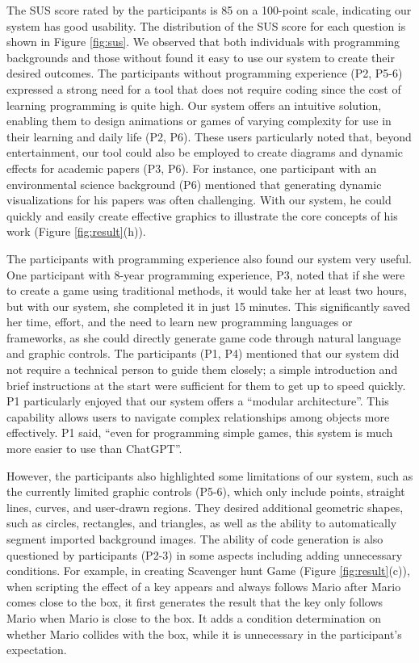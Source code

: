 The SUS score rated by the participants %
is 85 on a 100-point scale, indicating our system has good usability. The distribution of the SUS score for each question is shown in Figure \ref{fig:sus}. We observed that both individuals with programming backgrounds and those without found it easy to use our system to create their desired outcomes. The participants without programming experience (P2, P5-6) expressed a strong need for a tool that does not require coding since the cost of learning programming is quite high. Our system offers an intuitive solution, enabling them to design animations or games of varying complexity for use in their learning and daily life (P2, P6).
These users particularly noted that, beyond entertainment, our tool could also be employed to create diagrams and dynamic effects for academic papers (P3, P6). For instance, one participant with an environmental science background (P6) mentioned that generating dynamic visualizations for his papers was often challenging. With our system, he could quickly and easily create effective graphics to illustrate the core concepts of his work (Figure \ref{fig:result}(h)).

The participants with programming experience also found our system very useful. One participant with 8-year programming experience, P3, noted that if she were to create a game using traditional methods, it would take her at least two hours, but with our system, she completed it in just 15 minutes. This significantly saved {her} %
time, effort, and the need to learn new programming languages or frameworks, as she could directly generate game code through natural language and graphic controls. The participants (P1, P4) mentioned that our system did not require a technical person to guide them closely; a simple introduction and brief instructions at the start were sufficient for them to get up to speed quickly. 
{P1 particularly enjoyed that our system offers a ``modular architecture''. This capability allows users to navigate complex relationships among objects more effectively. P1 said, ``even for programming simple games, this system is much more easier to use than ChatGPT''. }

However, the participants also highlighted some limitations of our system, such as the currently limited graphic controls (P5-6), which only include points, straight lines, curves, and user-drawn regions. They desired %
additional geometric shapes, such as circles, rectangles, and triangles, as well as the ability to automatically segment imported background images. The ability of code generation is also questioned by participants (P2-3) in some aspects including adding unnecessary conditions. For example, in creating Scavenger hunt Game (Figure \ref{fig:result}(c)), when scripting the effect of a key appears and always follows Mario after Mario comes close to the box, it first generates the result that the key only follows Mario when Mario is close to the box. It adds a condition determination on whether Mario collides with the box, while it is unnecessary in the participant's expectation.

